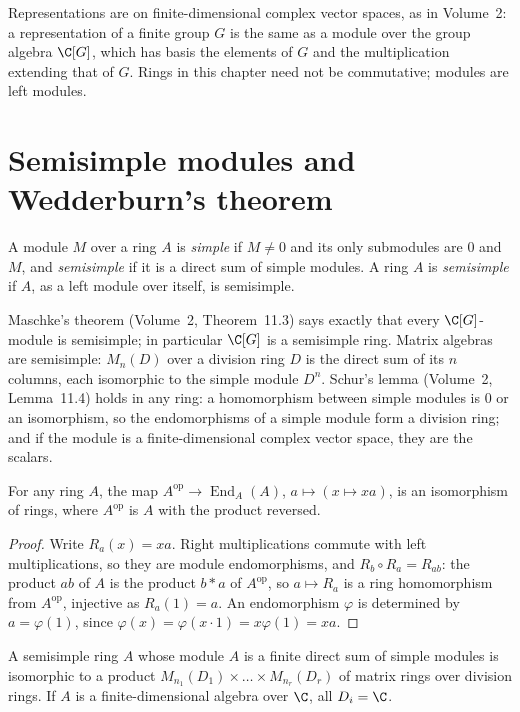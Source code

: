 Representations are on finite-dimensional complex vector spaces, as in Volume~2: a representation of a finite group $G$ is the same as a module over the group algebra $\C[G]$, which has basis the elements of $G$ and
the multiplication extending that of $G$. Rings in this chapter need not be commutative; modules are left modules.

\section{Semisimple modules and Wedderburn's theorem}

\begin{definition}\label{def:semisimple}
A module $M$ over a ring $A$ is \emph{simple} if $M\ne0$ and its only submodules are $0$ and $M$, and \emph{semisimple} if it is a direct sum of simple modules. A ring $A$ is \emph{semisimple} if $A$, as a left module over itself,
is semisimple.
\end{definition}

Maschke's theorem (Volume~2, Theorem~11.3) says exactly that every $\C[G]$-module is semisimple; in particular $\C[G]$ is a semisimple ring. Matrix algebras are semisimple: $M_n(D)$ over a division ring $D$ is the direct sum of its
$n$ columns, each isomorphic to the simple module $D^n$. Schur's lemma (Volume~2, Lemma~11.4) holds in any ring: a homomorphism between simple modules is $0$ or an isomorphism, so the endomorphisms of a simple module form a
division ring; and if the module is a finite-dimensional complex vector space, they are the scalars.

\begin{lemma}\label{lem:endA}
For any ring $A$, the map $A^{\mathrm{op}}\to\operatorname{End}_A(A)$, $a\mapsto(x\mapsto xa)$, is an isomorphism of rings, where $A^{\mathrm{op}}$ is $A$ with the product reversed.
\end{lemma}

\begin{proof}
Write $R_a(x)=xa$. Right multiplications commute with left multiplications, so they are module endomorphisms, and $R_b\circ R_a=R_{ab}$: the product $ab$ of $A$ is the product $b\ast a$ of $A^{\mathrm{op}}$, so
$a\mapsto R_a$ is a ring homomorphism from $A^{\mathrm{op}}$, injective as $R_a(1)=a$. An
endomorphism $\varphi$ is determined by $a=\varphi(1)$, since $\varphi(x)=\varphi(x\cdot1)=x\varphi(1)=xa$.
\end{proof}

\begin{theorem}[Wedderburn, 1908]\label{thm:wedderburn}
A semisimple ring $A$ whose module $A$ is a finite direct sum of simple modules is isomorphic to a product $M_{n_1}(D_1)\times\dots\times M_{n_r}(D_r)$ of matrix rings over division rings. If $A$ is a finite-dimensional algebra over $\C$,
all $D_i=\C$.
\end{theorem}

